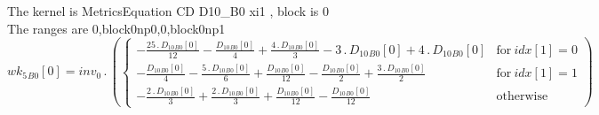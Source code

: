 \documentclass{article}
\begin{document}
\noindent The kernel is MetricsEquation CD D10_B0 xi1 , block is 0\\\noindent The ranges are 0,block0np0,0,block0np1\\\begin{dmath}{wk_{5}{_{B0}}}[{0}] = inv_0 \,.\, \left(\begin{cases} - \frac{25 \,.\, {D_{10}{_{B0}}}[{0}]}{12} - \frac{{D_{10}{_{B0}}}[{0}]}{4} + \frac{4 \,.\, {D_{10}{_{B0}}}[{0}]}{3} - 3 \,.\, {D_{10}{_{B0}}}[{0}] + 4 \,.\, {D_{10}{_{B0}}}[{0}] & 
\text{for}\: {idx}[{1}] = 0 \\- \frac{{D_{10}{_{B0}}}[{0}]}{4} - \frac{5 \,.\, {D_{10}{_{B0}}}[{0}]}{6} + \frac{{D_{10}{_{B0}}}[{0}]}{12} - \frac{{D_{10}{_{B0}}}[{0}]}{2} + \frac{3 \,.\, {D_{10}{_{B0}}}[{0}]}{2} & \text{for}\: {idx}[{1}] = 1 \\- 
\frac{2 \,.\, {D_{10}{_{B0}}}[{0}]}{3} + \frac{2 \,.\, {D_{10}{_{B0}}}[{0}]}{3} + \frac{{D_{10}{_{B0}}}[{0}]}{12} - \frac{{D_{10}{_{B0}}}[{0}]}{12} & \text{otherwise} \end{cases}\right)\end{dmath}
\end{document}
